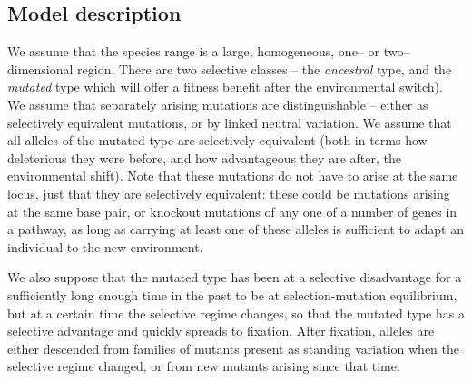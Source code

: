 \documentclass{article}
\begin{document}
\subsection{Model description}


We assume that the species range
is a large, homogeneous, one-- or two--dimensional region. 
There are two selective classes -- the \textit{ancestral} type,
and the {\em mutated} type which will offer a fitness benefit after the
environmental switch).
We assume that separately arising mutations are distinguishable --
either as selectively equivalent mutations, or by linked neutral variation.
We assume that all alleles of the mutated type are selectively
equivalent (both in terms how deleterious they were before, and how
advantageous they are after, the environmental shift). 
Note that these mutations do not have to arise at the same locus,
just that they are selectively equivalent:
these could be mutations arising at the same base pair, 
or knockout mutations of any one of a number of genes in a pathway,
as long as carrying at least one of these alleles
is sufficient to adapt an individual to the new environment.

We also suppose that 
the mutated type has been at a selective disadvantage 
for a sufficiently long enough time in the past to be at selection-mutation equilibrium,
but at a certain time the selective regime changes, so that the mutated type has a selective advantage and quickly spreads to fixation.
After fixation, alleles are either descended
from families of mutants present as standing variation when the selective regime changed,
or from new mutants arising since that time.
\end{document}
